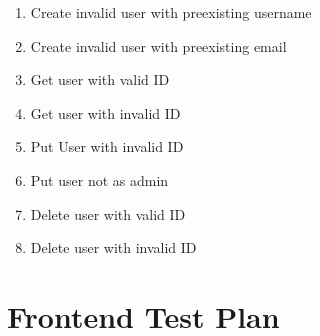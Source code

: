 \documentclass[12pt]{article}
\begin{document}
\begin{enumerate}
\begin{enumerate}
		\item Create invalid user with preexisting username
		\item Create invalid user with preexisting email 
		\item Get user with valid ID
		\item Get user with invalid ID
		\item Put User with invalid ID
		\item Put user not as admin
		\item Delete user with valid ID
		\item Delete user with invalid ID
	\end{enumerate}
\end{enumerate}

\clearpage
\section{Frontend Test Plan}
\label{appendix:frontendtest}
\end{document}
